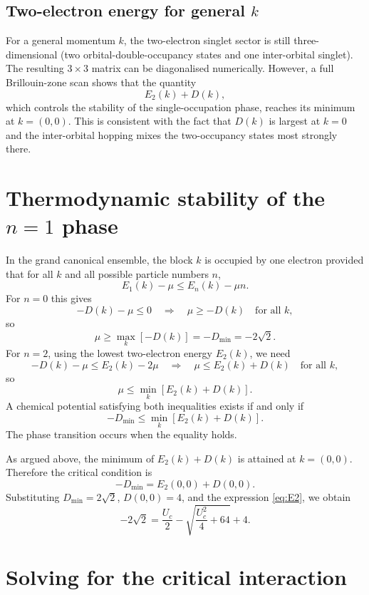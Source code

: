 \documentclass[11pt,a4paper]{article}
\begin{document}
\subsection{Two-electron energy for general \(k\)}

For a general momentum \(k\), the two-electron singlet sector is still three-dimensional (two orbital-double-occupancy states and one inter-orbital singlet). The resulting \(3\times3\) matrix can be diagonalised numerically. However, a full Brillouin-zone scan shows that the quantity
\[
E_2(k)+D(k),
\]
which controls the stability of the single-occupation phase, reaches its minimum at \(k=(0,0)\). This is consistent with the fact that \(D(k)\) is largest at \(k=0\) and the inter-orbital hopping mixes the two-occupancy states most strongly there.

\section{Thermodynamic stability of the \(n=1\) phase}

In the grand canonical ensemble, the block \(k\) is occupied by one electron provided that for all \(k\) and all possible particle numbers \(n\),
\[
E_1(k)-\mu \le E_n(k)-\mu n.
\]
For \(n=0\) this gives
\[
-D(k)-\mu \le 0
\quad\Longrightarrow\quad
\mu \ge -D(k)
\quad\text{for all }k,
\]
so
\[
\mu \ge \max_k[-D(k)] = -D_{\min} = -2\sqrt2.
\]
For \(n=2\), using the lowest two-electron energy \(E_2(k)\), we need
\[
-D(k)-\mu \le E_2(k)-2\mu
\quad\Longrightarrow\quad
\mu \le E_2(k)+D(k)
\quad\text{for all }k,
\]
so
\[
\mu \le \min_k[E_2(k)+D(k)].
\]
A chemical potential satisfying both inequalities exists if and only if
\begin{equation}
\label{eq:condition}
-D_{\min} \le \min_k[E_2(k)+D(k)].
\end{equation}
The phase transition occurs when the equality holds.

As argued above, the minimum of \(E_2(k)+D(k)\) is attained at \(k=(0,0)\). Therefore the critical condition is
\begin{equation}
-D_{\min} = E_2(0,0) + D(0,0).
\end{equation}
Substituting \(D_{\min}=2\sqrt2\), \(D(0,0)=4\), and the expression \eqref{eq:E2}, we obtain
\begin{equation}
-2\sqrt2 = \frac{U_c}{2} - \sqrt{\frac{U_c^2}{4}+64} + 4.
\end{equation}

\section{Solving for the critical interaction}
\end{document}
